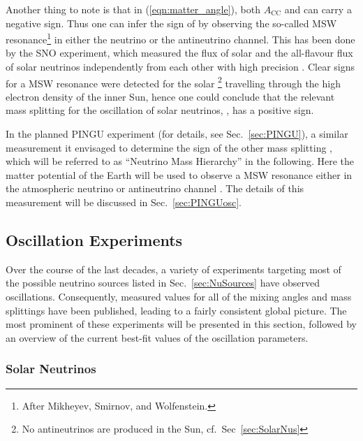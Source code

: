 Another thing to note is that in (\ref{eqn:matter_angle}), both $A_\mathrm{CC}$
and \dm{} can carry a negative sign. Thus one can infer the sign of \dm{} by
observing the so-called MSW resonance\footnote{After Mikheyev, Smirnov, and
Wolfenstein.} in either the neutrino or the antineutrino channel. This has been
done by the SNO experiment, which measured the flux of solar \nue and the
all-flavour flux of solar neutrinos independently from each other with high
precision \cite{SNOosc}. Clear signs for a MSW resonance were detected for the
solar \nue\footnote{No antineutrinos are produced in the Sun, cf.\
Sec~\ref{sec:SolarNus}} travelling through the high electron density of the
inner Sun, hence one could conclude that the relevant mass splitting for
the oscillation of solar neutrinos, \dm{21}, has a positive sign.

In the planned PINGU experiment (for details, see Sec.~\ref{sec:PINGU}), a
similar measurement it envisaged to determine the sign of the other mass
splitting \dm{31}, which will be referred to as ``Neutrino Mass Hierarchy'' in
the following. Here the matter potential of the Earth will be used to
observe a MSW resonance either in the atmospheric neutrino or antineutrino
channel \cite{Akhmedov, LoI}. The details of this measurement will be discussed
in Sec.~\ref{sec:PINGUosc}.




\subsection{Oscillation Experiments}
\label{sec:OscExp}

Over the course of the last decades, a variety of experiments targeting most of
the possible neutrino sources listed in Sec.~\ref{sec:NuSources} have observed
oscillations. Consequently, measured values for all of the mixing angles and
mass splittings have been published, leading to a fairly consistent global
picture. The most prominent of these experiments will be presented in this
section, followed by an overview of the current best-fit values of the
oscillation parameters.


\subsubsection{Solar Neutrinos}

